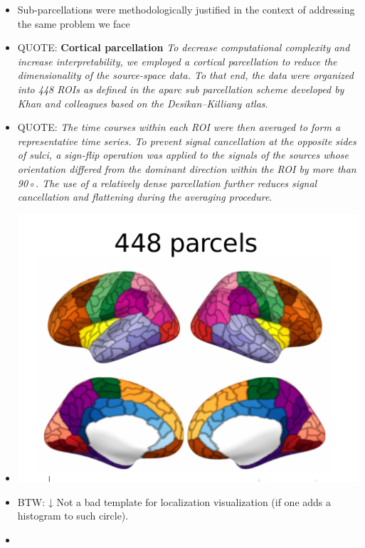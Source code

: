 \documentclass[a4paper,10pt,onecolumn,oneside,openright]{article}
\begin{document}
\begin{itemize}
\begin{itemize}
\begin{itemize}
\begin{itemize}
\item Sub-parcellations were methodologically justified in the
context of addressing the same problem we face
\item QUOTE: \textbf{Cortical parcellation} \emph{To decrease computational
complexity and increase interpretability, we employed a
cortical parcellation to reduce the dimensionality of the
source-space data. To that end, the data were organized
into 448 ROIs as defined in the aparc sub parcellation
scheme developed by Khan and colleagues
\parencite{r2018PaperKhanEtAlN2} based on the
Desikan–Killiany atlas}.
\item QUOTE: \emph{The time courses within each ROI were then
averaged to form a representative time series. To prevent
signal cancellation at the opposite sides of sulci, a
sign-flip operation was applied to the signals of the
sources whose orientation differed from the dominant
direction within the ROI by more than 90◦. The use of a
relatively dense parcellation further reduces signal
cancellation and flattening during the averaging
procedure}.
\item \begin{center}
\includegraphics[width=.9\linewidth]{aux-imgs/r2025PaperRuuskanenAvendano-DiazN1-img-0001.png}
\end{center}
\item BTW: ↓ Not a bad template for localization visualization (if
one adds a histogram to such circle).
\item \begin{center}

\end{center}
\end{itemize}
\end{itemize}
\end{itemize}
\end{itemize}
\end{document}
